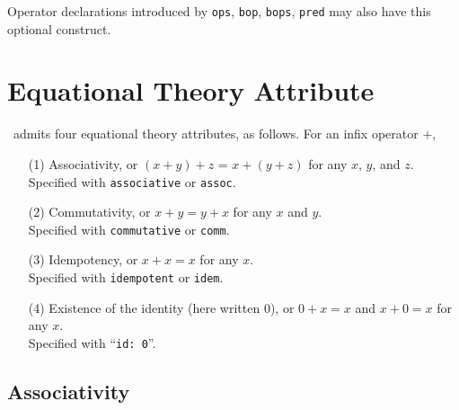 \documentclass[a4paper]{memoir}
\begin{document}
Operator declarations introduced by \verb|ops|, \verb|bop|, \verb|bops|,
\verb|pred| may also have this optional construct.

\section{Equational Theory Attribute}\label{sec:p2-equational-theory}
\cafeobj~admits four equational theory attributes, as follows. For
an infix operator $+$,
\begin{itemize}
\item[(1)] Associativity, or $(x + y) + z$ = $x + (y + z)$ for any
  $x$, $y$, and $z$. \\
  Specified with \verb|associative| or \verb|assoc|.
\item[(2)] Commutativity, or $x + y = y + x$ for any $x$ and $y$. \\
  Specified with \verb|commutative| or \verb|comm|.
\item[(3)] Idempotency, or $x + x = x$ for any $x$. \\
  Specified with \verb|idempotent| or \verb|idem|.
\item[(4)] Existence of the identity (here written $0$), or
  $0 + x = x$ and $x + 0 = x$ for any $x$. \\
  Specified with ``\verb|id: 0|''.
\end{itemize}

\subsection{Associativity}
\end{document}

